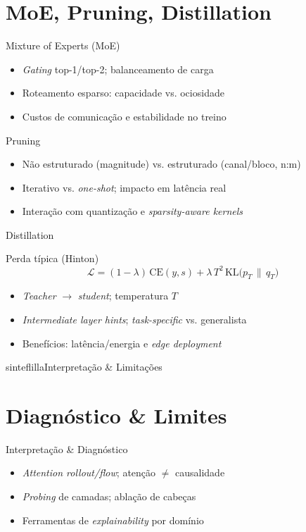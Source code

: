 \documentclass{beamer}
\begin{document}
\section{MoE, Pruning, Distillation}
\begin{frame}{Mixture of Experts (MoE)}
	\begin{itemize}[<+->]
		\item \textit{Gating} top-1/top-2; balanceamento de carga
		\item Roteamento esparso: capacidade vs. ociosidade
		\item Custos de comunicação e estabilidade no treino
	\end{itemize}
\end{frame}

\begin{frame}{Pruning}
	\begin{itemize}[<+->]
		\item Não estruturado (magnitude) vs. estruturado (canal/bloco, n:m)
		\item Iterativo vs. \textit{one-shot}; impacto em latência real
		\item Interação com quantização e \textit{sparsity-aware kernels}
	\end{itemize}
\end{frame}

\begin{frame}{Distillation}
	\begin{block}{Perda típica (Hinton)}
		\small
		\[
			\mathcal{L}=(1-\lambda)\,\mathrm{CE}(y,s)+\lambda\,T^2\,\mathrm{KL}\!\big(p_T \,\|\, q_T\big)
		\]
	\end{block}
	\begin{itemize}[<+->]
		\item \textit{Teacher} $\rightarrow$ \textit{student}; temperatura $T$
		\item \textit{Intermediate layer hints}; \textit{task-specific} vs. generalista
		\item Benefícios: latência/energia e \textit{edge deployment}
	\end{itemize}
\end{frame}

\begin{chapter}{sinteflilla}{Interpretação \& Limitações}\end{chapter}

\section{Diagnóstico \& Limites}
\begin{frame}{Interpretação \& Diagnóstico}
	\begin{itemize}[<+->]
		\item \textit{Attention rollout/flow}; atenção $\neq$ causalidade
		\item \textit{Probing} de camadas; ablação de cabeças
		\item Ferramentas de \textit{explainability} por domínio
	\end{itemize}
\end{frame}
\end{document}
